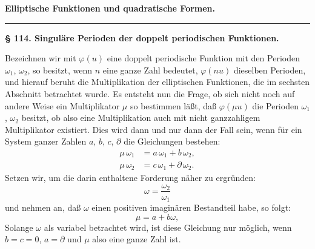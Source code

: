 \begin{center}

\textbf{\Large Elliptische Funktionen und quadratische Formen.}

\rule{0.12\linewidth}{0.4pt}
\end{center}

\textbf{§ 114. Singuläre Perioden der doppelt periodischen Funktionen.}

Bezeichnen wir mit $\varphi(u)$ eine doppelt periodische Funktion mit den Perioden $\omega_1$, $\omega_2$, so besitzt, wenn $n$ eine ganze Zahl bedeutet, $\varphi(nu)$ dieselben Perioden, und hierauf beruht die Multiplikation der elliptischen Funktionen, die im sechsten Abschnitt betrachtet wurde. Es entsteht nun die Frage, ob sich nicht noch auf andere Weise ein Multiplikator $\mu$ so bestimmen läßt, daß $\varphi(\mu u)$ die Perioden $\omega_1$, $\omega_2$ besitzt, ob also eine Multiplikation auch mit nicht ganzzahligem Multiplikator existiert. Dies wird dann und nur dann der Fall sein, wenn für ein System ganzer Zahlen $a$, $b$, $c$, $\partial$ die Gleichungen bestehen:
\[
\begin{aligned}
\mu\,\omega_1 &= a\,\omega_1 + b\,\omega_2,\\
\mu\,\omega_2 &= c\,\omega_1 + \partial\,\omega_2.
\end{aligned}
\]
Setzen wir, um die darin enthaltene Forderung näher zu ergründen:
\[
\omega = \dfrac{\omega_2}{\omega_1}
\]
und nehmen an, daß $\omega$ einen positiven imaginären Bestandteil habe, so folgt:
\[\mu=a+b\omega,\]
Solange $\omega$ als variabel betrachtet wird, ist diese Gleichung nur möglich, wenn $b=c=0$, $a=\partial$ und $\mu$ also eine ganze Zahl ist.
